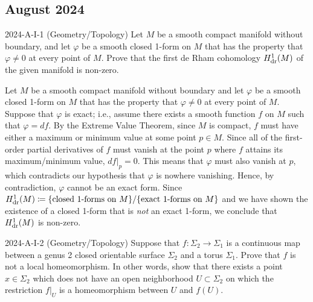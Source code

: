 \documentclass{article}
\begin{document}
\subsection{August 2024}
\begin{prb}{2024-A-I-1 (Geometry/Topology)}
	Let $M$ be a smooth compact manifold without boundary, and let $\varphi$ be a smooth closed 1-form on $M$ that has the property that $\varphi \neq 0$ at every point of $M$. Prove that the first de Rham cohomology $H^{1}_{\text{dr}}(M)$ of the given manifold is non-zero. 
\end{prb}
\begin{solutions}
	Let $M$ be a smooth compact manifold without boundary and let $\varphi$ be a smooth closed 1-form on $M$ that has the property that $\varphi \neq 0$ at every point of $M$. Suppose that $\varphi$ is exact; i.e., assume there exists a smooth function $f$ on $M$ such that $\varphi = df$. By the Extreme Value Theorem, since $M$ is compact, $f$ must have either a maximum or minimum value at some point $p \in M$. Since all of the first-order partial derivatives of $f$ must vanish at the point $p$ where $f$ attains its maximum/minimum value, $df|_{p} = 0$. This means that $\varphi$ must also vanish at $p$, which contradicts our hypothesis that $\varphi$ is nowhere vanishing. Hence, by contradiction, $\varphi$ cannot be an exact form. Since $\h{1}(M) \coloneqq \brac*{\text{closed 1-forms on $M$}}/\brac*{\text{exact 1-forms on $M$}}$ and we have shown the existence of a closed 1-form that is \textit{not} an exact 1-form, we conclude that $H^{1}_{\text{dr}}(M)$ is non-zero. 
\end{solutions}
\begin{prb}{2024-A-I-2 (Geometry/Topology)}
	Suppose that $f: \Sigma_{2} \to \Sigma_{1}$ is a continuous map between a genus 2 closed orientable surface $\Sigma_{2}$ and a torus $\Sigma_{1}$. Prove that $f$ is not a local homeomorphism. In other words, show that there exists a point $x \in \Sigma_{2}$ which does not have an open neighborhood $U \subset \Sigma_{2}$ on which the restriction $f|_{U}$ is a homeomorphism between $U$ and $f(U)$. 
\end{prb}
\end{document}
